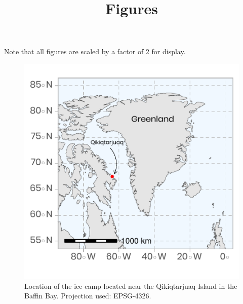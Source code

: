 \documentclass[12pt,a4paper]{scrartcl}
\title{Figures}
\date{}
\begin{document}
\maketitle

Note that all figures are scaled by a factor of 2 for display.

\begin{figure}[h]
	\centering
	\includegraphics[scale = 2]{../../../graphs/fig1.pdf}
	\caption{Location of the ice camp located near the Qikiqtarjuaq Island in the Baffin Bay. Projection used: EPSG-4326.}
\end{figure}

\clearpage
\newpage
\end{document}
